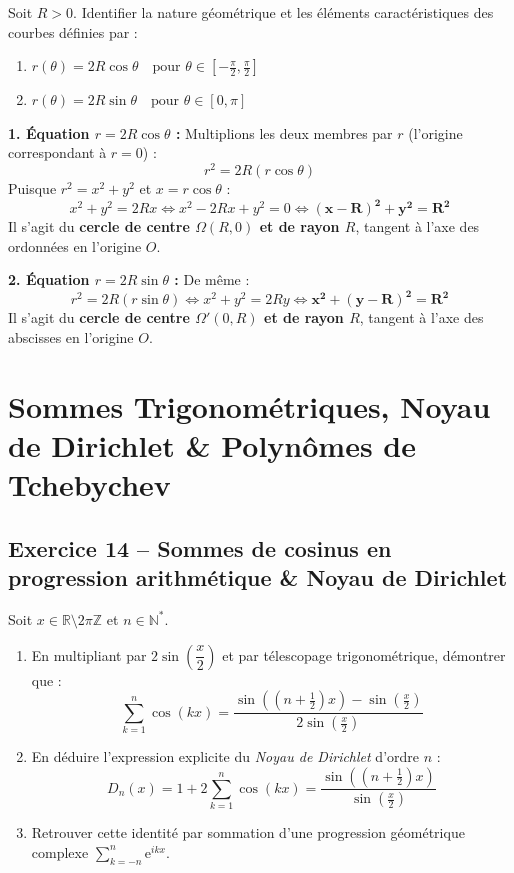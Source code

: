 \documentclass[11pt,a4paper]{article}
\newcommand{\N}{\mathbb{N}}
\newcommand{\Z}{\mathbb{Z}}
\newcommand{\R}{\mathbb{R}}
\newcommand{\e}{\mathrm{e}}
\begin{document}
Soit $R > 0$. Identifier la nature géométrique et les éléments caractéristiques des courbes définies par :
\begin{enumerate}[label=\arabic*.]
    \item $r(\theta) = 2R \cos\theta \quad \text{pour } \theta \in \left[-\frac{\pi}{2}, \frac{\pi}{2}\right]$
    \item $r(\theta) = 2R \sin\theta \quad \text{pour } \theta \in [0, \pi]$
\end{enumerate}

\begin{correctionbox}
\textbf{1. Équation $r = 2R\cos\theta$ :}
Multiplions les deux membres par $r$ (l'origine correspondant à $r = 0$) :
\[
r^2 = 2R(r\cos\theta)
\]
Puisque $r^2 = x^2 + y^2$ et $x = r\cos\theta$ :
\[
x^2 + y^2 = 2Rx \iff x^2 - 2Rx + y^2 = 0 \iff \mathbf{(x - R)^2 + y^2 = R^2}
\]
Il s'agit du \textbf{cercle de centre $\Omega(R, 0)$ et de rayon $R$}, tangent à l'axe des ordonnées en l'origine $O$.

\textbf{2. Équation $r = 2R\sin\theta$ :}
De même :
\[
r^2 = 2R(r\sin\theta) \iff x^2 + y^2 = 2Ry \iff \mathbf{x^2 + (y - R)^2 = R^2}
\]
Il s'agit du \textbf{cercle de centre $\Omega'(0, R)$ et de rayon $R$}, tangent à l'axe des abscisses en l'origine $O$.
\end{correctionbox}

\vspace{0.4cm}

\section{Sommes Trigonométriques, Noyau de Dirichlet \& Polynômes de Tchebychev}

\subsection*{Exercice 14 -- Sommes de cosinus en progression arithmétique \& Noyau de Dirichlet}

Soit $x \in \R \setminus 2\pi\Z$ et $n \in \N^*$.
\begin{enumerate}[label=\arabic*.]
    \item En multipliant par $2\sin\left(\dfrac{x}{2}\right)$ et par télescopage trigonométrique, démontrer que :
    \[
    \sum_{k=1}^n \cos(kx) = \frac{\sin\left(\left(n+\frac{1}{2}\right)x\right) - \sin\left(\frac{x}{2}\right)}{2\sin\left(\frac{x}{2}\right)}
    \]
    \item En déduire l'expression explicite du \emph{Noyau de Dirichlet} d'ordre $n$ :
    \[
    D_n(x) = 1 + 2\sum_{k=1}^n \cos(kx) = \frac{\sin\left(\left(n+\frac{1}{2}\right)x\right)}{\sin\left(\frac{x}{2}\right)}
    \]
    \item Retrouver cette identité par sommation d'une progression géométrique complexe $\sum_{k=-n}^n \e^{ikx}$.
\end{enumerate}
\end{document}
